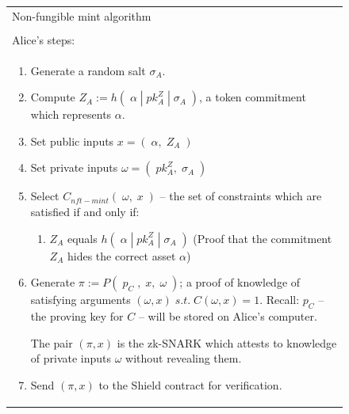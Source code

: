 \documentclass{article}
\begin{document}
\newpage
\begin{figure}[H]
	\begin{center}
		\begin{framed}
      \begin{tabular}{p{16cm}}
        Non-fungible mint algorithm \\
        \\
        \hline
        Alice's steps:\\
        \begin{enumerate}
				  \item Generate a random salt $\sigma_{A}$.
				  \item Compute $Z_A := h(\;\alpha\;|\;pk^Z_A\;|\;\sigma_{A}\;)$, a token commitment which represents $\alpha$.
          \item Set public inputs $x = (\;\alpha,\;Z_A\;)$
          \item Set private inputs $\omega = (\;pk_A^Z,\;\sigma_{A}\;)$
          \item Select $C_{nft-mint}(\;\omega,\;x\;)$ -- the set of constraints which are satisfied if and only if:
          \begin{enumerate}
            \item $Z_A$ equals $h(\;\alpha\;|\;pk_A^Z\;|\;\sigma_A\;)$ (Proof that the commitment $Z_A$ hides the correct asset $\alpha$)
          \end{enumerate}
          \item Generate $\pi := P(\;p_C\;,\;x,\;\omega\;)$; a proof of knowledge of satisfying arguments $(\omega, x)\;s.t.\;C(\omega, x) = 1$. Recall: $p_C$ -- the proving key for $C$ -- will be stored on Alice's computer.

          The pair $(\pi, x)$ is the zk-SNARK which attests to knowledge of private inputs $\omega$ without revealing them.
          \item Send $(\pi, x)$ to the Shield contract for verification.


\end{enumerate}
\end{tabular}
\end{framed}
\end{center}
\end{figure}
\end{document}
